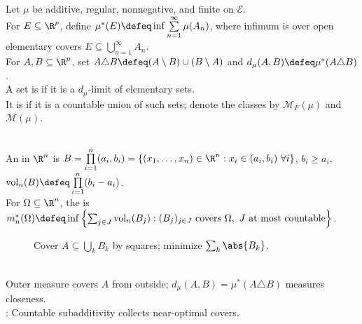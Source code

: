 \begin{definition} \label{def:outer-measure-and-rudin-measurable-sets} \\
Let $\mu$ be additive, regular, nonnegative, and finite on $\mathcal{E}$.\\
For $E\subseteq\R^p$, define $\mu^\ast(E)\defeq\inf\sum\limits_{n=1}^{\infty}\mu(A_n)$, where infimum is over open elementary covers $E\subseteq\bigcup\limits_{n=1}^{\infty}A_n$.\\
For $A,B\subseteq\R^p$, set $A\triangle B\defeq(A\setminus B)\cup(B\setminus A)$ and $d_\mu(A,B)\defeq\mu^\ast(A\triangle B)$.\\
A set is  if it is a $d_\mu$-limit of elementary sets.\\
It is  if it is a countable union of such sets; denote the classes by $\mathcal{M}_F(\mu)$ and $\mathcal{M}(\mu)$.
\end{definition}

\begin{definition} \label{def:tao-box-cover-outer-measure} \\
An  in $\R^n$ is $B=\prod\limits_{i=1}^{n}(a_i,b_i)=\{(x_1,\ldots,x_n)\in\R^n:x_i\in(a_i,b_i) \ \forall i \}$, $b_i\geq a_i$, $\operatorname{vol}_n(B)\defeq\prod\limits_{i=1}^{n}(b_i-a_i)$.\\
For $\Omega\subseteq\R^n$, the  is $m_n^\ast(\Omega)\defeq\inf\left\{\sum_{j\in J}\operatorname{vol}_n(B_j):(B_j)_{j\in J}\text{ covers }\Omega,\ J\text{ at most countable}\right\}$.
\end{definition}

\begin{figure}[H]
  \centering
  
  \caption{Cover $A\subseteq\bigcup_k B_k$ by squares; minimize $\sum_k\abs{B_k}$.}
  \label{fig:outer-measure-rectangle-cover}
\end{figure}

\begin{perspective} \label{per:outer-measure-geometric-box-covers} \\
Outer measure covers $A$ from outside; $d_\mu(A,B)=\mu^\ast(A\triangle B)$ measures closeness.\\
: Countable subadditivity collects near-optimal covers.
\end{perspective}

